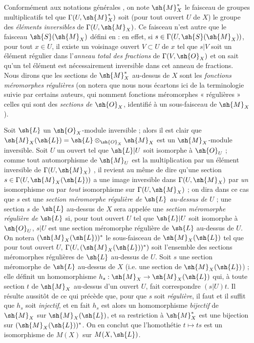\begin{env}[20.1.8]
\label{IV.20.1.8}
Conformément aux notations générales , on note $\sh{M}_X^*$ le faisceau de groupes multiplicatifs tel que $\Gamma(U,\sh{M}_X^*)$ soit (pour tout ouvert $U$ de $X$) le groupe des \emph{éléments inversibles} de $\Gamma(U,\sh{M}_X)$.
Ce faisceau n'est autre que le faisceau $\sh{S}(\sh{M}_X)$ défini en  : en effet, si $s\in\Gamma(U,\sh{S}(\sh{M}_X))$, pour tout $x\in U$, il existe un voisinage ouvert $V\subset U$ de $x$ tel que $s|V$ soit un élément régulier dans l'\emph{anneau total des fractions} de $\Gamma(V,\sh{O}_X)$ et on sait qu'un tel élément est nécessairement inversible dans cet anneau de fractions.
Nous dirons que les sections de $\sh{M}_X^*$ au-dessus de $X$ sont les \emph{fonctions méromorphes régulières} (on notera que nous nous écartons ici de la terminologie suivie par certains auteurs, qui nomment fonctions méromorphes « régulières » celles qui sont des \emph{sections de $\sh{O}_X$}, identifié à un sous-faisceau de $\sh{M}_X$).

Soit $\sh{L}$ un $\sh{O}_X$-module inversible  ; alors il est clair que $\sh{M}_X(\sh{L})=\sh{L}\otimes_{\sh{O}_X}\sh{M}_X$
est un $\sh{M}_X$-module inversible.
Soit $U$ un ouvert tel que $\sh{L}|U$ soit isomorphe à $\sh{O}_U$ ; comme tout automorphisme de $\sh{M}_U$ est la multiplication par un élément inversible de $\Gamma(U,\sh{M}_X)$ , il revient au même de dire qu'une section $s\in\Gamma(U,\sh{M}_X(\sh{L}))$ a une image inversible dans $\Gamma(U,\sh{M}_X)$ par \emph{un} isomorphisme ou par \emph{tout} isomorphisme sur $\Gamma(U,\sh{M}_X)$ ; on dira dans ce cas que $s$ est une \emph{section méromorphe régulière de $\sh{L}$ au-dessus de $U$} ; une section $s$ de $\sh{L}$ au-dessus de $X$ sera appelée une \emph{section méromorphe régulière de $\sh{L}$} si, pour tout ouvert $U$ tel que $\sh{L}|U$ soit isomorphe à $\sh{O}_U$, $s|U$ est une section méromorphe régulière de $\sh{L}$ au-dessus de $U$.
On notera $(\sh{M}_X(\sh{L}))^*$ le sous-faisceau de $\sh{M}_X(\sh{L})$ tel que pour tout ouvert $U$, $\Gamma(U,(\sh{M}_X(\sh{L}))^*)$ soit l'ensemble des sections méromorphes régulières de $\sh{L}$ au-dessus de $U$.
Soit $s$ une section méromorphe de $\sh{L}$ au-dessus de $X$ (i.e. une section de $\sh{M}_X(\sh{L})$) ; elle définit un homomorphisme $h_s:\sh{M}_X\to\sh{M}_X(\sh{L})$ qui, à toute section $t$ de $\sh{M}_X$ au-dessus d'un ouvert $U$, fait correspondre $(s|U)t$.
Il résulte aussitôt de ce qui précède que, pour que $s$ soit \emph{régulière}, il faut et il suffit que $h_s$ soit \emph{injectif}, et en fait $h_s$ est alors un homomorphisme \emph{bijectif} de $\sh{M}_X$ sur $\sh{M}_X(\sh{L})$, et sa restriction à $\sh{M}_X^*$ est une bijection sur $(\sh{M}_X(\sh{L}))^*$.
On en conclut que l'homothétie $t\mapsto ts$ est un isomorphisme de $M(X)$ sur $M(X,\sh{L})$.
\end{env}

